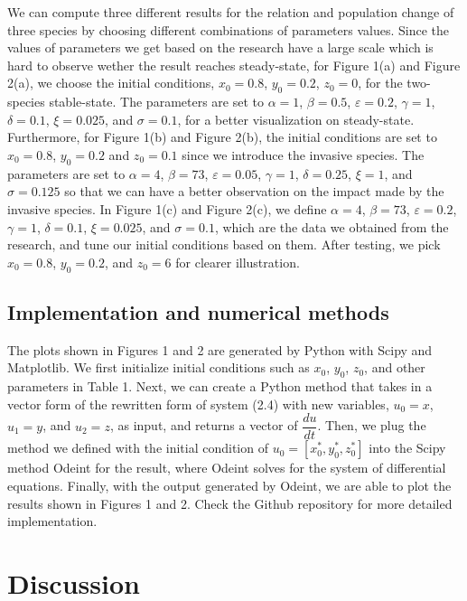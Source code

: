 \documentclass{article}
\begin{document}
\noindent We can compute three different results for the relation and population change of three species by choosing different combinations of parameters values. Since the values of parameters we get based on the research have a large scale which is hard to observe wether the result reaches steady-state, for Figure 1(a) and Figure 2(a), we choose the initial conditions, $x_0=0.8$, $y_0 = 0.2$, $z_0 = 0$, for the two-species stable-state. The parameters are set to $\alpha = 1$, $\beta = 0.5$, $\varepsilon = 0.2$, $\gamma = 1$, $\delta = 0.1$, $\xi = 0.025$, and $\sigma=0.1$, for a better visualization on steady-state. Furthermore, for Figure 1(b) and Figure 2(b), the initial conditions are set to $x_0=0.8$, $y_0 = 0.2$ and $z_0 = 0.1$ since we introduce the invasive species. The parameters are set to $\alpha = 4$, $\beta = 73$, $\varepsilon = 0.05$, $\gamma = 1$, $\delta = 0.25$, $\xi = 1$, and $\sigma=0.125$ so that we can have a better observation on the impact made by the invasive species. In Figure 1(c) and Figure 2(c), we define $\alpha = 4$, $\beta = 73$, $\varepsilon = 0.2$, $\gamma = 1$, $\delta = 0.1$, $\xi = 0.025$, and $\sigma = 0.1$, which are the data we obtained from the research, and tune our initial conditions based on them. After testing, we pick $x_0 = 0.8$, $y_0 = 0.2$, and $z_0 = 6$ for clearer illustration.

\subsection*{Implementation and numerical methods}

\noindent The plots shown in Figures 1 and 2 are generated by Python with Scipy and Matplotlib. We first initialize initial conditions such as $x_0$, $y_0$, $z_0$, and other parameters in Table 1. Next, we can create a Python method that takes in a vector form of the rewritten form of system (2.4) with new variables, $u_0 = x$, $u_1 = y$, and $u_2 = z$, as input, and returns a vector of $\dfrac{du}{dt}$. Then, we plug the method we defined with the initial condition of $u_0 = [x_0^*, y_0^*, z_0^*]$ into the Scipy method Odeint for the result, where Odeint solves for the system of differential equations. Finally, with the output generated by Odeint, we are able to plot the results shown in Figures 1 and 2. Check the Github repository for more detailed implementation.

\section{Discussion}
\end{document}
